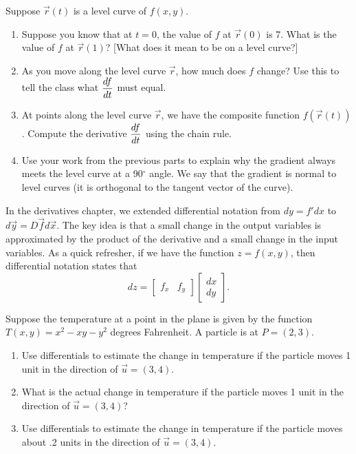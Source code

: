 \begin{problem}
 Suppose $\vec r(t)$ is a level curve of $f(x,y)$.  
\begin{enumerate}
 \item Suppose you know that at $t=0$, the value of $f$ at $\vec r(0)$ is 7.  What is the value of $f$ at $\vec r(1)$? [What does it mean to be on a level curve?]
 \item As you move along the level curve $\vec r$, how much does $f$ change?  Use this to tell the class what $\displaystyle\frac{df}{dt}$ must equal.
 \item At points along the level curve $\vec r$, we have the composite function $f(\vec r(t))$.  Compute the derivative $\displaystyle\frac{df}{dt}$ using the chain rule.
 \item Use your work from the previous parts to explain why the gradient always meets the level curve at a 90$^\circ$ angle.  We say that the gradient is normal to level curves (it is orthogonal to the tangent vector of the curve).
\end{enumerate}
\end{problem}

In the derivatives chapter, we extended differential notation from $dy=f' dx$ to $d\vec y = D\vec f d\vec x$. The key idea is that a small change in the output variables is approximated by the product of the derivative and a small change in the input variables. As a quick refresher, if  we have the function $z=f(x,y)$, then differential notation states that $$dz = \begin{bmatrix}f_x&f_y\end{bmatrix} \begin{bmatrix}dx\\dy\end{bmatrix}.$$ 

\begin{problem}
Suppose the temperature at a point in the plane is given by the function {$T(x,y)=x^2-xy-y^2$} degrees Fahrenheit. A particle is at $P=(2,3)$.  
\begin{enumerate}
 \item Use differentials to estimate the change in temperature if the particle moves 1 unit in the direction of $\vec u=\left(3,4\right)$.
 \item What is the actual change in temperature if the particle moves 1 unit in the direction of $\vec u=\left(3,4\right)$?
 \item Use differentials to estimate the change in temperature if the particle moves about .2 units in the direction of $\vec u=\left(3,4\right)$.
\end{enumerate}
\end{problem}

